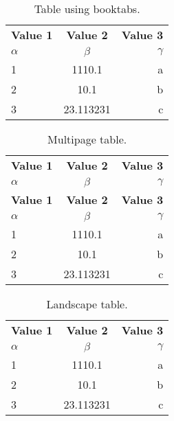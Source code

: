 \documentclass{article}
\begin{document}


\begin{table}[h!]
  \begin{center}
    \caption{Table using booktabs.}
    \label{tab:table1}
    \begin{tabular}{l|c|r}
      \toprule %
      \textbf{Value 1} & \textbf{Value 2} & \textbf{Value 3}\\
      $\alpha$ & $\beta$ & $\gamma$ \\
      \midrule %
      1 & 1110.1 & a\\
      2 & 10.1 & b\\
      3 & 23.113231 & c\\
      \bottomrule %
    \end{tabular}
  \end{center}
\end{table}



\begin{longtable}[c]{l|c|r} %
  \caption{Multipage table.}
  \label{tab:table1}\\
  \toprule
  \textbf{Value 1} & \textbf{Value 2} & \textbf{Value 3}\\
  $\alpha$ & $\beta$ & $\gamma$ \\
  \midrule
  \endfirsthead %
  \toprule
  \textbf{Value 1} & \textbf{Value 2} & \textbf{Value 3}\\
  $\alpha$ & $\beta$ & $\gamma$ \\
  \midrule
  \endhead %
  1 & 1110.1 & a\\
  2 & 10.1 & b\\
  3 & 23.113231 & c\\
  \bottomrule
\end{longtable}



\begin{sidewaystable}[h!] %
  \begin{center}
  \caption{Landscape table.}
  \label{tab:table1}
  \begin{tabular}{l|c|r}
      \toprule
      \textbf{Value 1} & \textbf{Value 2} & \textbf{Value 3}\\
      $\alpha$ & $\beta$ & $\gamma$ \\
    \midrule
    1 & 1110.1 & a\\
    2 & 10.1 & b\\
    3 & 23.113231 & c\\
    \bottomrule
  \end{tabular}
  \end{center}
\end{sidewaystable}

\end{document}
